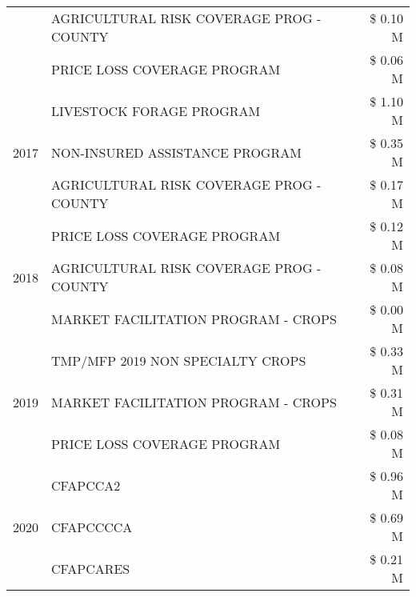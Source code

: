 \begin{tabular}{llr}
 & AGRICULTURAL RISK COVERAGE PROG - COUNTY      & \$ 0.10 M \\
 & PRICE LOSS COVERAGE PROGRAM                   & \$ 0.06 M \\
\cline{1-3}
\multirow[t]{3}{*}{2017} & LIVESTOCK FORAGE PROGRAM & \$ 1.10 M \\
 & NON-INSURED ASSISTANCE PROGRAM & \$ 0.35 M \\
 & AGRICULTURAL RISK COVERAGE PROG - COUNTY & \$ 0.17 M \\
\cline{1-3}
\multirow[t]{3}{*}{2018} & PRICE LOSS COVERAGE PROGRAM & \$ 0.12 M \\
 & AGRICULTURAL RISK COVERAGE PROG - COUNTY & \$ 0.08 M \\
 & MARKET FACILITATION PROGRAM - CROPS & \$ 0.00 M \\
\cline{1-3}
\multirow[t]{3}{*}{2019} & TMP/MFP 2019 NON SPECIALTY CROPS & \$ 0.33 M \\
 & MARKET FACILITATION PROGRAM - CROPS & \$ 0.31 M \\
 & PRICE LOSS COVERAGE PROGRAM & \$ 0.08 M \\
\cline{1-3}
\multirow[t]{3}{*}{2020} & CFAPCCA2 & \$ 0.96 M \\
 & CFAPCCCCA & \$ 0.69 M \\
 & CFAPCARES & \$ 0.21 M \\
\cline{1-3}
\bottomrule
\end{tabular}
